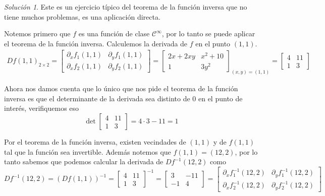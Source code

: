 \documentclass[a4paper,oneside,10.5pt]{article}
\theoremstyle{definition}
\theoremstyle{plain}
\theoremstyle{remark}
\theoremstyle{theorem}
\newtheorem{sol}{Solución}
\begin{document}
\begin{sol}
    Este es un ejercicio típico del teorema de la función inversa que no tiene muchos problemas, es una aplicación directa.

    Notemos primero que $f$ es una función de clase $\mathcal{C}^\infty$, por lo tanto se puede aplicar el teorema de la función inversa. Calculemos la derivada de $f$ en el punto $(1, 1)$.
    \begin{align*}
        {Df(1, 1)}_{2 \times 2} = \begin{bmatrix}
            \partial_x f_1(1, 1) & \partial_y f_1(1, 1)\\
            \partial_x f_2(1, 1) & \partial_y f_2(1, 1)
        \end{bmatrix} = \begin{bmatrix}
            2x + 2xy & x^2 + 10\\ 1 & 3y^2
        \end{bmatrix}_{(x, y) = (1, 1)} = \begin{bmatrix}
            4 & 11\\
            1 & 3
        \end{bmatrix}
    \end{align*}

    Ahora nos damos cuenta que lo único que nos pide el teorema de la función inversa es que el determinante de la derivada sea distinto de $0$ en el punto de interés, verifiquemos eso
    \begin{equation*}
        \det \begin{bmatrix}
            4 & 11\\
            1 & 3
        \end{bmatrix} = 4 \cdot 3 - 11 = 1
    \end{equation*}

    Por el teorema de la función inversa, existen vecindades de $(1, 1)$ y de $f(1, 1)$ tal que la función sea invertible. Además notemos que $f(1, 1) = (12, 2)$, por lo tanto sabemos que podemos calcular la derivada de $Df^{-1}(12, 2)$ como
    \begin{equation*}
        Df^{-1}(12, 2) = {(Df(1, 1))}^{-1} = \begin{bmatrix}
            4 & 11\\
            1 & 3
        \end{bmatrix}^{-1} = \begin{bmatrix}
            3 & -11\\
            -1 & 4
        \end{bmatrix} = \begin{bmatrix}
            \partial_x f^{-1}_1(12, 2) & \partial_y f^{-1}_1(12, 2)\\
            \partial_x f^{-1}_2(12, 2) & \partial_y f^{-1}_2(12, 2)
        \end{bmatrix}
    \end{equation*}
\end{sol}
\end{document}
